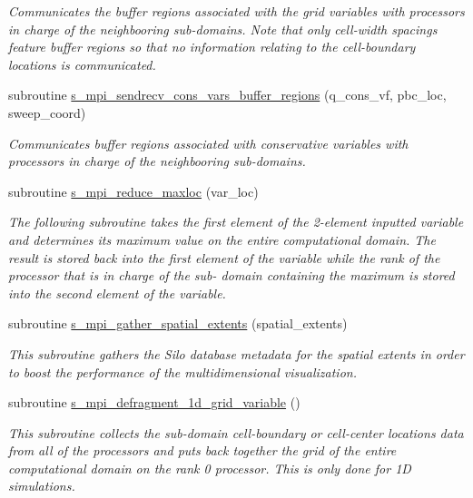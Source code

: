 \begin{Indent}
\begin{DoxyCompactItemize}
\begin{DoxyCompactList}\small\item\em Communicates the buffer regions associated with the grid variables with processors in charge of the neighbooring sub-\/domains. Note that only cell-\/width spacings feature buffer regions so that no information relating to the cell-\/boundary locations is communicated. \end{DoxyCompactList}\item 
subroutine \hyperlink{namespacem__mpi__proxy_a4d7ec0d1976967504babdf44ec83c1b1}{s\+\_\+mpi\+\_\+sendrecv\+\_\+cons\+\_\+vars\+\_\+buffer\+\_\+regions} (q\+\_\+cons\+\_\+vf, pbc\+\_\+loc, sweep\+\_\+coord)
\begin{DoxyCompactList}\small\item\em Communicates buffer regions associated with conservative variables with processors in charge of the neighbooring sub-\/domains. \end{DoxyCompactList}\item 
subroutine \hyperlink{namespacem__mpi__proxy_adaa028bb99f844487de8d6e4507e7734}{s\+\_\+mpi\+\_\+reduce\+\_\+maxloc} (var\+\_\+loc)
\begin{DoxyCompactList}\small\item\em The following subroutine takes the first element of the 2-\/element inputted variable and determines its maximum value on the entire computational domain. The result is stored back into the first element of the variable while the rank of the processor that is in charge of the sub-\/ domain containing the maximum is stored into the second element of the variable. \end{DoxyCompactList}\item 
subroutine \hyperlink{namespacem__mpi__proxy_ab2ced8f095b812fcc355539c2c5fa162}{s\+\_\+mpi\+\_\+gather\+\_\+spatial\+\_\+extents} (spatial\+\_\+extents)
\begin{DoxyCompactList}\small\item\em This subroutine gathers the Silo database metadata for the spatial extents in order to boost the performance of the multidimensional visualization. \end{DoxyCompactList}\item 
subroutine \hyperlink{namespacem__mpi__proxy_ac15a15ba12e6110bb015af0ece5bba47}{s\+\_\+mpi\+\_\+defragment\+\_\+1d\+\_\+grid\+\_\+variable} ()
\begin{DoxyCompactList}\small\item\em This subroutine collects the sub-\/domain cell-\/boundary or cell-\/center locations data from all of the processors and puts back together the grid of the entire computational domain on the rank 0 processor. This is only done for 1D simulations. \end{DoxyCompactList}\item 

\end{DoxyCompactItemize}
\end{Indent}
